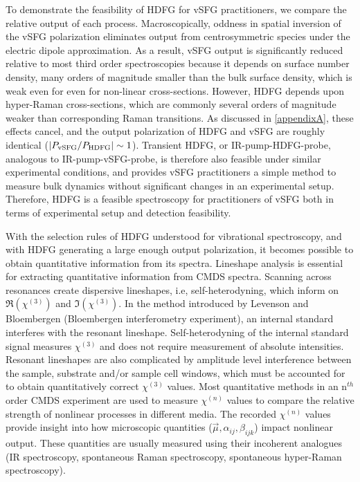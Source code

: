 \documentclass[aip, jcp, reprint, twocolumn]{revtex4-2}
\begin{document}
To demonstrate the feasibility of HDFG for vSFG practitioners, we compare the relative output of each process. 
Macroscopically, oddness in spatial inversion of the vSFG polarization eliminates output from centrosymmetric species under the electric dipole approximation.\cite{RN132, RN133}
As a result, vSFG output is significantly reduced relative to most third order spectroscopies because it depends on surface number density, many orders of magnitude smaller than the bulk surface density, which is weak even for even for non-linear cross-sections.
However, HDFG depends upon hyper-Raman cross-sections, which are commonly several orders of magnitude weaker than corresponding Raman transitions.\cite{RN515}
As discussed in \autoref{appendixA}, these effects cancel, and the output polarization of HDFG and vSFG are roughly identical ($\abs{P_\text{vSFG} / P_\text{HDFG}} \sim 1$).
Transient HDFG, or IR-pump-HDFG-probe, analogous to IR-pump-vSFG-probe, is therefore also feasible under similar experimental conditions, and provides vSFG practitioners a simple method to measure bulk dynamics without significant changes in an experimental setup. 
Therefore, HDFG is a feasible spectroscopy for practitioners of vSFG both in terms of experimental setup and detection feasibility.

With the selection rules of HDFG understood for vibrational spectroscopy, and with HDFG generating a large enough output polarization, it becomes possible to obtain quantitative information from its spectra.
Lineshape analysis is essential for extracting quantitative information from CMDS spectra.
Scanning across resonances create dispersive lineshapes, i.e, self-heterodyning, which inform on $\Re(\chi^{(3)})$ and $\Im(\chi^{(3)})$.\cite{Levenson1974_1, Levenson1974_2}
In the method introduced by Levenson and Bloembergen (Bloembergen interferometry experiment), an internal standard interferes with the resonant lineshape.
Self-heterodyning of the internal standard signal measures $\chi^{(3)}$ and does not require measurement of absolute intensities. 
Resonant lineshapes are also complicated by amplitude level interference between the sample,  substrate and/or sample cell windows, which must be accounted for to obtain quantitatively correct $\chi^{(3)}$ values. \cite{RN362, RN418}
Most quantitative methods in an n$^{th}$ order CMDS experiment are used to measure $\chi^{(n)}$ values to compare the relative strength of nonlinear processes in different media. \cite{Zhu87, RN351, RN345}
The recorded $\chi^{(n)}$ values provide insight into how microscopic quantities ($\vec{\mu}, \alpha_{ij}, \beta_{ijk}$) impact nonlinear output.
These quantities are usually measured using their incoherent analogues (IR spectroscopy, spontaneous Raman spectroscopy, spontaneous hyper-Raman spectroscopy). \cite{Levenson1974_2, RN412, Shoute2005}
\end{document}
